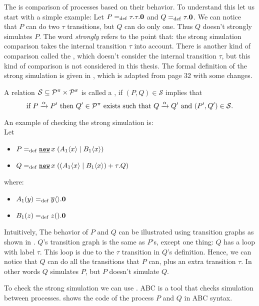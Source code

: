The  is comparison of processes based on their behavior. To understand this let us start with a simple example:
Let $P=_{\mathrm{def}}\tau.\tau.\mathbf{0}$ and $Q=_{\mathrm{def}}\tau.\mathbf{0}$. We can notice that $P$ can do two $\tau$ transitions, but $Q$ can do only one. Thus $Q$ doesn't strongly simulates $P$. The word \textit{strongly} refers to the point that: the strong simulation comparison takes the internal transition $\tau$ into account. There is another kind of comparison called the  , which doesn't consider the internal transition $\tau$, but this kind of comparison is not considered in this thesis. The formal definition of the strong simulation is given in , which is adapted from \cite{gieseking} page 32 with some changes.


\begin{definition}
\label{def_strong_sim}
A relation $\mathcal{S}\subseteq\mathcal P^{\pi}\times\mathcal P^{\pi}$ is called a , if $(P,Q)\in\mathcal{S}$ implies that
\[\text{if } P \xrightarrow{\alpha} P' \text{ then }Q'\in\mathcal P^{\pi} \text{ exists such that } Q \xrightarrow{\alpha} Q' \text{ and } (P',Q')\in\mathcal{S}.\]
\end{definition}

An example of checking the strong simulation is:
\\Let
\begin{itemize}
\item $P\define\procres{x}{(\procpar{\proccall{A_1}{x}}{\proccall{B_1}{x}})}$ 
\item $Q\define\procres{x}{(\procchoice{(\procpar{\proccall{A_1}{x}}{\proccall{B_1}{x}})}{\tau.Q})}$
\end{itemize}
where:
\begin{itemize}
\item $A_1(y)=_{\mathrm{def}}{}\overline{y}\langle{}\rangle.\mathbf{0}$
\item $B_1(z)=_{\mathrm{def}}{}z({}).\mathbf{0}$
\end{itemize}

Intuitively, The behavior of $P$ and $Q$ can be illustrated using transition graphs as shown in . $Q$'s transition graph is the same as $P$'s, except one thing: $Q$ has a loop with label $\tau$. This loop is due to the $\tau$ transition in $Q$'s definition. Hence, we can notice that $Q$ can do all the transitions that $P$ can, plus an extra transition $\tau$. In other words $Q$ simulates $P$, but $P$ doesn't simulate $Q$.

To check the strong simulation we can use  \cite{abc}. ABC is a tool that checks simulation between  \picalc{} processes.  shows the code of the process $P$ and $Q$ in ABC syntax.
\raggedbottom


